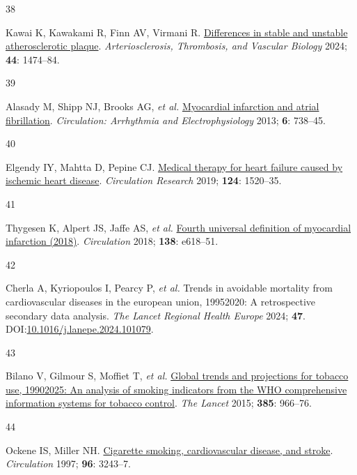 \documentclass[
  a4paper,
  headsepline=true,
  open=left]{scrbook}
\newlength{\cslhangindent}
\newlength{\csllabelwidth}
\newlength{\cslentryspacingunit} %
\newenvironment{CSLReferences}[2] %
 {%
  \setlength{\parindent}{0pt}
  \ifodd #1
  \let\oldpar\par
  \def\par{\hangindent=\cslhangindent\oldpar}
  \fi
  \setlength{\parskip}{#2\cslentryspacingunit}
 }%
 {}
\newcommand{\CSLLeftMargin}[1]{\parbox[t]{\csllabelwidth}{#1}}
\newcommand{\CSLRightInline}[1]{\parbox[t]{\linewidth - \csllabelwidth}{#1}\break}
\begin{document}
\begin{CSLReferences}{0}{0}
\leavevmode{}%
\CSLLeftMargin{38 }%
\CSLRightInline{Kawai K, Kawakami R, Finn AV, Virmani R.
\href{https://doi.org/10.1161/ATVBAHA.124.319396}{Differences in stable
and unstable atherosclerotic plaque}. \emph{Arteriosclerosis,
Thrombosis, and Vascular Biology} 2024; \textbf{44}: 1474--84.}

\leavevmode{}%
\CSLLeftMargin{39 }%
\CSLRightInline{Alasady M, Shipp NJ, Brooks AG, \emph{et al.}
\href{https://doi.org/10.1161/CIRCEP.113.000163}{Myocardial infarction
and atrial fibrillation}. \emph{Circulation: Arrhythmia and
Electrophysiology} 2013; \textbf{6}: 738--45.}

\leavevmode{}%
\CSLLeftMargin{40 }%
\CSLRightInline{Elgendy IY, Mahtta D, Pepine CJ.
\href{https://doi.org/10.1161/CIRCRESAHA.118.313568}{Medical therapy for
heart failure caused by ischemic heart disease}. \emph{Circulation
Research} 2019; \textbf{124}: 1520--35.}

\leavevmode{}%
\CSLLeftMargin{41 }%
\CSLRightInline{Thygesen K, Alpert JS, Jaffe AS, \emph{et al.}
\href{https://doi.org/10.1161/CIR.0000000000000617}{Fourth universal
definition of myocardial infarction (2018)}. \emph{Circulation} 2018;
\textbf{138}: e618--51.}

\leavevmode{}%
\CSLLeftMargin{42 }%
\CSLRightInline{Cherla A, Kyriopoulos I, Pearcy P, \emph{et al.} Trends
in avoidable mortality from cardiovascular diseases in the european
union, 1995{\textendash}2020: A retrospective secondary data analysis.
\emph{The Lancet Regional Health {\textendash} Europe} 2024;
\textbf{47}.
DOI:\href{https://doi.org/10.1016/j.lanepe.2024.101079}{10.1016/j.lanepe.2024.101079}.}

\leavevmode{}%
\CSLLeftMargin{43 }%
\CSLRightInline{Bilano V, Gilmour S, Moffiet T, \emph{et al.}
\href{https://doi.org/10.1016/S0140-6736(15)60264-1}{Global trends and
projections for tobacco use, 1990{\textendash}2025: An analysis of
smoking indicators from the WHO comprehensive information systems for
tobacco control}. \emph{The Lancet} 2015; \textbf{385}: 966--76.}

\leavevmode{}%
\CSLLeftMargin{44 }%
\CSLRightInline{Ockene IS, Miller NH.
\href{https://doi.org/10.1161/01.CIR.96.9.3243}{Cigarette smoking,
cardiovascular disease, and stroke}. \emph{Circulation} 1997;
\textbf{96}: 3243--7.}


\end{CSLReferences}
\end{document}
